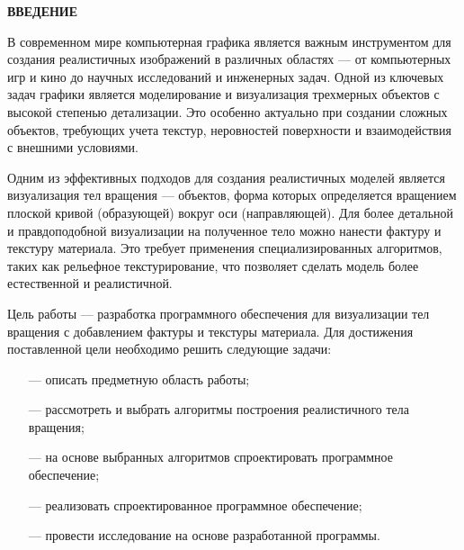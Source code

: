 \begin{center}
    \textbf{ВВЕДЕНИЕ}
\end{center}

В современном мире компьютерная графика является важным инструментом для создания реалистичных изображений в различных областях --- от компьютерных игр и кино до научных исследований и инженерных задач. Одной из ключевых задач графики является моделирование и визуализация трехмерных объектов с высокой степенью детализации. Это особенно актуально при создании сложных объектов, требующих учета текстур, неровностей поверхности и взаимодействия с внешними условиями.

Одним из эффективных подходов для создания реалистичных моделей является визуализация тел вращения --- объектов, форма которых определяется вращением плоской кривой (образующей) вокруг оси (направляющей). Для более детальной и правдоподобной визуализации на полученное тело можно нанести фактуру и текстуру материала. Это требует применения специализированных алгоритмов, таких как рельефное текстурирование, что позволяет сделать модель более естественной и реалистичной.

Цель работы --- разработка программного обеспечения для визуализации тел вращения с добавлением фактуры и текстуры материала. Для достижения поставленной цели необходимо решить следующие задачи:
\begin{itemize}
    \item[---] описать предметную область работы;
    \item[---] рассмотреть и выбрать алгоритмы построения реалистичного тела вращения;
    \item[---] на основе выбранных алгоритмов спроектировать программное обеспечение;
    \item[---] реализовать спроектированное программное обеспечение;
    \item[---] провести исследование на основе разработанной программы.
\end{itemize}